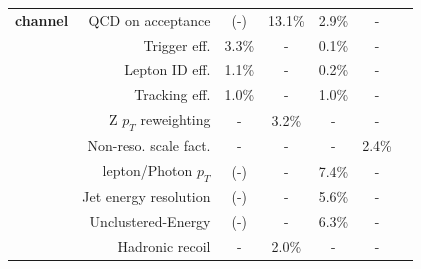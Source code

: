 \begin{table}[htbp]
\begin{center}
\begin{footnotesize}
\begin{tabular}{l r c c c c c }
{\bf channel}&QCD on acceptance			&  	(-)	&	13.1\%		&	2.9\%			&	-						\\ 
{}	&	Trigger eff.			&	3.3\%	&	-		&	0.1\%			&	-						\\
{}	&	Lepton ID eff.			&	1.1\%	&	-		&	0.2\%			&	-						\\
{}	&	Tracking eff.			&	1.0\%	&	-		&	1.0\%			&	-					\\
{}	&	Z $p_T$ reweighting		&	-	&	3.2\%		&	-			&	-						\\
{}	&	Non-reso. scale fact.		&	-	&	-		&	-			&	2.4\%					\\ 
{}	&	\ptmiss lepton/Photon $p_T$		&	(-)	&	-		&	7.4\%			&	-						\\
{}	&	\ptmiss Jet energy resolution	&	(-)	&	-		&	5.6\%			&	-						\\
{}	&	\ptmiss Unclustered-Energy		&	(-)	&	-		&	6.3\%			&	-						\\
{}	&	\ptmiss Hadronic recoil		&	-	&	2.0\%		&	-			&	-						\\
%
\hline\hline
\end{tabular}
\end{footnotesize}
\end{center}
\end{table}

